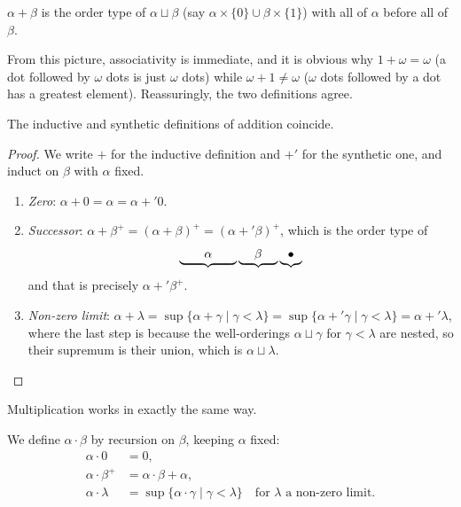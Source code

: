 \begin{definition}
  $\alpha + \beta$ is the order type of $\alpha \sqcup \beta$ (say $\alpha \times \{0\} \cup \beta \times \{1\}$) with all of $\alpha$ before all of $\beta$.
\end{definition}

From this picture, associativity is immediate, and it is obvious why $1 + \omega = \omega$ (a dot followed by $\omega$ dots is just $\omega$ dots) while $\omega + 1 \neq \omega$ ($\omega$ dots followed by a dot has a greatest element). Reassuringly, the two definitions agree.

\begin{proposition}
  The inductive and synthetic definitions of addition coincide.
\end{proposition}
\begin{proof}
We write $+$ for the inductive definition and $+'$ for the synthetic one, and induct on $\beta$ with $\alpha$ fixed.
\begin{enumerate}[label=(\roman*)]
  \item \emph{Zero}: $\alpha + 0 = \alpha = \alpha +' 0$.
  \item \emph{Successor}: $\alpha + \beta^+ = (\alpha + \beta)^+ = (\alpha +' \beta)^+$, which is the order type of
  $$
  \underbrace{\quad\quad\vphantom{\beta}\alpha\vphantom{\beta}\quad\quad}\underbrace{\quad\;\beta\;\quad}
  \underbrace{\vphantom{\beta}\bullet\vphantom{\beta}}
  $$
  and that is precisely $\alpha +' \beta^+$.
  \item \emph{Non-zero limit}: $\alpha + \lambda = \sup\{\alpha + \gamma \mid \gamma < \lambda\} = \sup\{\alpha +' \gamma \mid \gamma < \lambda\} = \alpha +' \lambda$, where the last step is because the well-orderings $\alpha \sqcup \gamma$ for $\gamma < \lambda$ are nested, so their supremum is their union, which is $\alpha \sqcup \lambda$. \qedhere
\end{enumerate}
\end{proof}

Multiplication works in exactly the same way.

\begin{definition}
  We define $\alpha \cdot \beta$ by recursion on $\beta$, keeping $\alpha$ fixed:
  \begin{align*}
    \alpha \cdot 0 &= 0, \\
    \alpha \cdot \beta^+ &= \alpha \cdot \beta + \alpha, \\
    \alpha \cdot \lambda &= \sup \{\alpha \cdot \gamma \mid \gamma < \lambda\} \quad \text{for } \lambda \text{ a non-zero limit.}
  \end{align*}
\end{definition}

